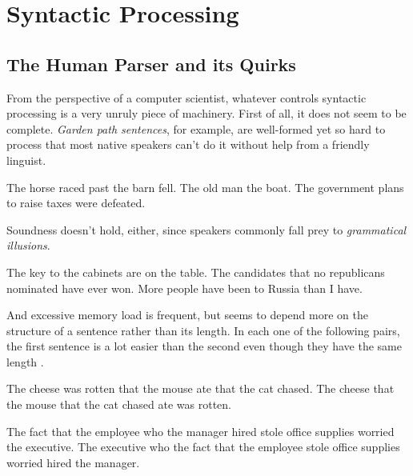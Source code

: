 \section{Syntactic Processing}
\label{sec:BigPicture_Processing}

\subsection{The Human Parser and its Quirks}
\label{sub:BigPicture_HumanParser}
From the perspective of a computer scientist, whatever controls syntactic processing is a very unruly piece of machinery.
First of all, it does not seem to be complete. 
\emph{Garden path sentences}, for example, are well-formed yet so hard to process that most native speakers can't do it without help from a friendly linguist.
%
\begin{exe}
    \ex
    \begin{xlist}
        \ex The horse raced past the barn fell.
        \ex The old man the boat.
        \ex The government plans to raise taxes were defeated.
    \end{xlist}
\end{exe}
%
Soundness doesn't hold, either, since speakers commonly fall prey to \emph{grammatical illusions}.
%
\begin{exe}
    \ex
    \begin{xlist}
        \ex The key to the cabinets are on the table.
        \ex The candidates that no republicans nominated have ever won.
        \ex More people have been to Russia than I have.
    \end{xlist}
\end{exe}
%
And excessive memory load is frequent, but seems to depend more on the structure of a sentence rather than its length.
In each one of the following pairs, the first sentence is a lot easier than the second even though they have the same length \citep[cf.][]{Gibson98, Resnik92}.
%
\begin{exe}
    \ex
    \begin{xlist}
        \ex The cheese was rotten that the mouse ate that the cat chased. 
        \ex The cheese that the mouse that the cat chased ate was rotten.
    \end{xlist}
    \ex
    \begin{xlist}
        \ex The fact that the employee who the manager hired stole office supplies worried the executive.
        \ex The executive who the fact that the employee stole office supplies worried hired the manager.
    \end{xlist}
\end{exe}

